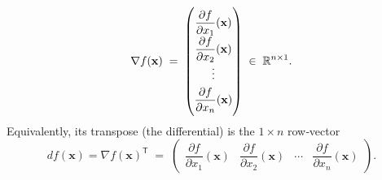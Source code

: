 \documentclass[11pt,openany]{article}
\begin{document}
%
\[
\nabla f(\mathbf x)
\;=\;
\begin{pmatrix}
	\dfrac{\partial f}{\partial x_1}(\mathbf x)\\[6pt]
	\dfrac{\partial f}{\partial x_2}(\mathbf x)\\[4pt]
	\vdots\\[4pt]
	\dfrac{\partial f}{\partial x_n}(\mathbf x)
\end{pmatrix}
\;\in\;\mathbb{R}^{n\times1}.
\]
Equivalently, its transpose (the differential) is the \(1\times n\) row‐vector
\[
d f(\mathbf x)
=\nabla f(\mathbf x)^{\mathsf T}
\;=\;
\begin{pmatrix}
	\dfrac{\partial f}{\partial x_1}(\mathbf x)
	&\dfrac{\partial f}{\partial x_2}(\mathbf x)
	&\cdots
	&\dfrac{\partial f}{\partial x_n}(\mathbf x)
\end{pmatrix}.
\]
\end{document}
